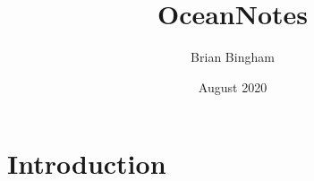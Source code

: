 \documentclass{article}
\title{OceanNotes}
\author{Brian Bingham}
\date{August 2020}
\begin{document}
\maketitle

\section{Introduction}
\end{document}
